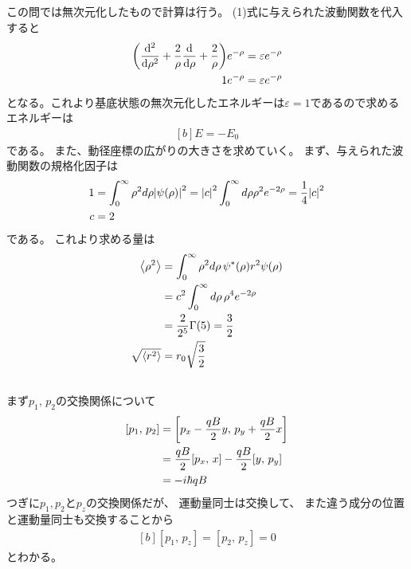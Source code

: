 \documentclass[../../master.tex]{subfiles}
\begin{document}
\subsection{}
この問では無次元化したもので計算は行う。
(1)式に与えられた波動関数を代入すると
\begin{equation}\begin{aligned}[b]
    \qty(\dv[2]{\rho}+\frac{2}{\rho}\dv{\rho}+\frac{2}{\rho})e^{-\rho} &= \varepsilon e^{-\rho}\\
    1e^{-\rho} &= \varepsilon e^{-\rho}
\end{aligned}\end{equation}
となる。これより基底状態の無次元化したエネルギーは\(\varepsilon = 1\)であるので求めるエネルギーは
\begin{equation}\begin{aligned}[b]
    E = -E_0
\end{aligned}\end{equation}
である。
また、動径座標の広がりの大きさを求めていく。
まず、与えられた波動関数の規格化因子は
\begin{equation}\begin{aligned}[b]
    1 &= \int_{0}^{\infty} \rho^2 d\rho \abs{\psi(\rho)}^2
        = \abs{c}^2\int_{0}^{\infty} d\rho \rho^2 e^{-2\rho} = \frac{1}{4}\abs{c}^2\\
    c &= 2
\end{aligned}\end{equation}
である。
これより求める量は
\begin{equation}\begin{aligned}[b]
    \ev{\rho^2}
    &= \int_{0}^{\infty} \rho^2 d\rho\, \psi^*(\rho)r^2\psi(\rho)\\
    &= c^2 \int_{0}^{\infty} d\rho\, \rho^4 e^{-2\rho}\\
    &= \frac{2}{2^5}\Gamma(5) = \frac{3}{2}\\
    \sqrt{\ev{r^2}} &= r_0\sqrt{\frac{3}{2}}
\end{aligned}\end{equation}

\subsection{}
まず\(p_1,\,p_2\)の交換関係について
\begin{equation}\begin{aligned}[b]
    [p_1,\,p_2]&= \qty[p_x-\frac{qB}{2}y,\,p_y+\frac{qB}{2}x]\\
    &=\frac{qB}{2}[p_x,\,x]-\frac{qB}{2}[y,\,p_y]\\
    &= -i\hbar qB
\end{aligned}\end{equation}
つぎに\(p_1,p_2\)と\(p_z\)の交換関係だが、
運動量同士は交換して、
また違う成分の位置と運動量同士も交換することから
\begin{equation}\begin{aligned}[b]
    [p_1,\,p_z] = [p_2,\,p_z] = 0
\end{aligned}\end{equation}
とわかる。
\end{document}
